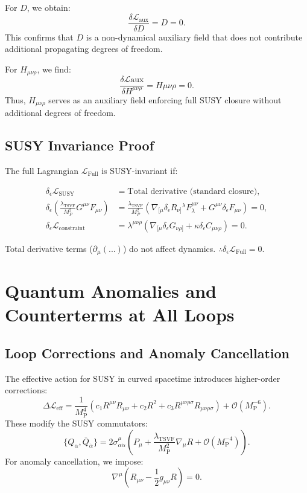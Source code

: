 \documentclass[12pt, onecolumn]{article}
\theoremstyle{definition}
\newcommand{\tsvf}{\lambda_{\mathrm{TSVF}}}
\newcommand{\Mp}{M_{\mathrm{P}}}
\numberwithin{equation}{section}
\begin{document}
For $D$, we obtain:
\begin{equation}
\frac{\delta \mathcal{L}_{\text{aux}}}{\delta D} = D = 0.
\end{equation}
This confirms that $D$ is a non-dynamical auxiliary field that does not contribute additional propagating degrees of freedom.

For $H_{\mu\nu\rho}$, we find:
\begin{equation}
\frac{\delta \mathcal{L}{\text{aux}}}{\delta H^{\mu\nu\rho}} = H{\mu\nu\rho} = 0.
\end{equation}
Thus, $H_{\mu\nu\rho}$ serves as an auxiliary field enforcing full SUSY closure without additional degrees of freedom.

\subsection{SUSY Invariance Proof}  
\label{subsec:susy-proof}

The full Lagrangian \(\mathcal{L}_{\text{Full}}\) is SUSY-invariant if:  

\begin{align}
\delta_\epsilon \mathcal{L}_{\text{SUSY}} &= \text{Total derivative (standard closure)}, \\
\delta_\epsilon \left(\frac{\tsvf}{M_P^2} G^{\mu\nu} F_{\mu\nu} \right) 
&= \frac{\tsvf}{M_P^2} \left( \nabla_{[\mu} \delta_\epsilon R_{\nu]}{}^{\lambda} F_{\lambda}^{\mu\nu} 
+ G^{\mu\nu} \delta_\epsilon F_{\mu\nu} \right) = 0, \\
\delta_\epsilon \mathcal{L}_{\text{constraint}} &= \lambda^{\mu\nu\rho} 
\left( \nabla_{[\mu} \delta_\epsilon G_{\nu\rho]} + \kappa \delta_\epsilon C_{\mu\nu\rho} \right) = 0.
\end{align}

Total derivative terms (\(\partial_\mu(...)\)) do not affect dynamics.  
\(\therefore \delta_\epsilon \mathcal{L}_{\text{Full}} = 0\).

\section{Quantum Anomalies and Counterterms at All Loops}
\subsection{Loop Corrections and Anomaly Cancellation}
The effective action for SUSY in curved spacetime introduces higher-order corrections:
\begin{equation}
\Delta \mathcal{L}_{\text{eff}} = \frac{1}{\Mp^4} \left(c_1 R^{\mu\nu} R_{\mu\nu} + c_2 R^2 + c_3 R^{\mu\nu\rho\sigma} R_{\mu\nu\rho\sigma}\right) + \mathcal{O}(\Mp^{-6}).
\end{equation}
These modify the SUSY commutators:
\begin{equation}
\{Q_\alpha, \bar{Q}_{\dot{\alpha}}\} = 2 \sigma^\mu_{\alpha\dot{\alpha}} \left( P_\mu + \frac{\tsvf}{\Mp^2} \nabla_\mu R + \mathcal{O}(\Mp^{-4}) \right).
\end{equation}
For anomaly cancellation, we impose:
\begin{equation}
\nabla^\mu \left(R_{\mu\nu} - \frac{1}{2} g_{\mu\nu} R \right) = 0.
\end{equation}
\end{document}

